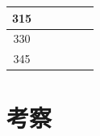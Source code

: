 \begin{table}[htbp]
\begin{center}
\begin{tabular}{|p{20mm}|p{20mm}|p{20mm}|p{20mm}|p{20mm}|p{20mm}|}
            \multicolumn{1}{|c|}{315}                     & \multicolumn{1}{|r|}{}                        & \multicolumn{1}{|r|}{}                   & \multicolumn{1}{|r|}{}                    & \multicolumn{1}{|r|}{}                   & \multicolumn{1}{|r|}{}                         \\ \hline
            \multicolumn{1}{|c|}{330}                     & \multicolumn{1}{|r|}{}                        & \multicolumn{1}{|r|}{}                   & \multicolumn{1}{|r|}{}                    & \multicolumn{1}{|r|}{}                   & \multicolumn{1}{|r|}{}                         \\ \hline
            \multicolumn{1}{|c|}{345}                     & \multicolumn{1}{|r|}{}                        & \multicolumn{1}{|r|}{}                   & \multicolumn{1}{|r|}{}                    & \multicolumn{1}{|r|}{}                   & \multicolumn{1}{|r|}{}                         \\ \hline
        \end{tabular}
    \end{center}
\end{table}

\section{考察}